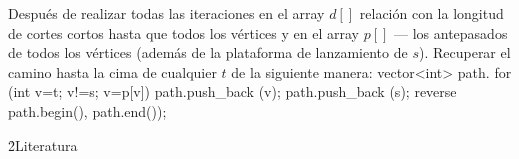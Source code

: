 Después de realizar todas las iteraciones en el array $d[]$ relación con la longitud de cortes cortos hasta que todos los vértices y en el array $p[]$ --- los antepasados de todos los vértices (además de la plataforma de lanzamiento de $s$). Recuperar el camino hasta la cima de cualquier $t$ de la siguiente manera:
\code
vector<int> path.
for (int v=t; v!=s; v=p[v])
path.push_back (v);
path.push_back (s);
reverse path.begin(), path.end());
\endcode

\h2{Literatura}

\ul{
\li {}
\li {}
}
